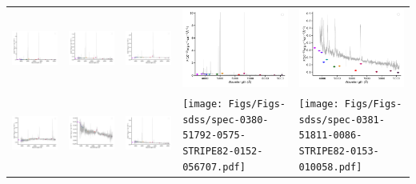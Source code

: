 \begin{center}
\begin{longtable}{l l l l l }
    \includegraphics[width=0.19\linewidth, clip]{Figs/Figs-sdss/spec-0372-52173-0286-STRIPE82-0127-009047.pdf} & \includegraphics[width=0.19\linewidth, clip]{Figs/Figs-sdss/spec-0372-52173-0296-SPLUS-s02s04-032140.pdf} & \includegraphics[width=0.19\linewidth, clip]{Figs/Figs-sdss/spec-0373-51788-0507-STRIPE82-0132-025641.pdf} & \includegraphics[width=0.19\linewidth, clip]{Figs/Figs-sdss/spec-0376-52143-0160-STRIPE82-0139-046699.pdf} & \includegraphics[width=0.19\linewidth, clip]{Figs/Figs-sdss/spec-0376-52143-0631-STRIPE82-0142-027354.pdf} \\
    \includegraphics[width=0.19\linewidth, clip]{Figs/Figs-sdss/spec-0377-52145-0294-STRIPE82-0141-019376.pdf} & \includegraphics[width=0.19\linewidth, clip]{Figs/Figs-sdss/spec-0377-52145-0484-STRIPE82-0142-017985.pdf} & \includegraphics[width=0.19\linewidth, clip]{Figs/Figs-sdss/spec-0378-52146-0223-STRIPE82-0145-047131.pdf} & \texttt{[image: Figs/Figs-sdss/spec-0380-51792-0575-STRIPE82-0152-056707.pdf]} & \texttt{[image: Figs/Figs-sdss/spec-0381-51811-0086-STRIPE82-0153-010058.pdf]} \\

\end{longtable}
\end{center}
